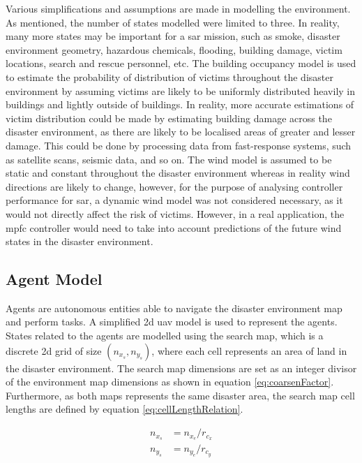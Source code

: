 \documentclass[conference]{IEEEtran}
\begin{document}
Various simplifications and assumptions are made in modelling the environment.
As mentioned, the number of states modelled were limited to three.
In reality, many more states may be important for a \gls{sar} mission, such as smoke, disaster environment geometry, hazardous chemicals, flooding, building damage, victim locations, search and rescue personnel, etc.
The building occupancy model is used to estimate the probability of distribution of victims throughout the disaster environment by assuming victims are likely to be uniformly distributed heavily in buildings and lightly outside of buildings.
In reality, more accurate estimations of victim distribution could be made by estimating building damage across the disaster environment, as there are likely to be localised areas of greater and lesser damage.
This could be done by processing data from fast-response systems, such as satellite scans, seismic data, and so on.
The wind model is assumed to be static and constant throughout the disaster environment whereas in reality wind directions are likely to change, however, for the purpose of analysing controller performance for \gls{sar}, a dynamic wind model was not considered necessary, as it would not directly affect the risk of victims.
However, in a real application, the \gls{mpfc} controller would need to take into account predictions of the future wind states in the disaster environment.
 
\subsection{Agent Model} \label{subsec:agentModel}
Agents are autonomous entities able to navigate the disaster environment map and perform tasks.
A simplified \gls{2d} \gls{uav} model is used to represent the agents.
States related to the agents are modelled using the search map, which is a discrete \gls{2d} grid of size $(n_{x_{s}}, n_{y_{s}})$, where each cell represents an area of land in the disaster environment.
The search map dimensions are set as an integer divisor of the environment map dimensions as shown in equation \ref{eq:coarsenFactor}.
Furthermore, as both maps represents the same disaster area, the search map cell lengths are defined by equation \ref{eq:cellLengthRelation}.

\begin{equation}
    \label{eq:coarsenFactor}
    \begin{split}
        n_{x_{s}} &= n_{x_{e}} / r_{c_{x}} \\
        n_{y_{s}} &= n_{y_{e}} / r_{c_{y}}
    \end{split}
\end{equation}
\end{document}
